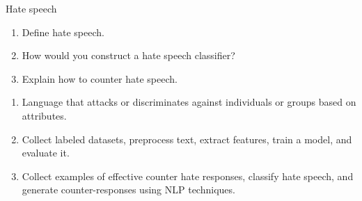 \documentclass{article}
\begin{document}
\begin{exercise}{Hate speech}\label{ex:hate-speech}
  \begin{enumerate}
    \item Define hate speech.
    \item How would you construct a hate speech classifier?
    \item Explain how to counter hate speech.
  \end{enumerate}

  \begin{solution}
    \begin{enumerate}
        \item Language that attacks or discriminates against individuals or groups based on attributes.
        \item Collect labeled datasets, preprocess text, extract features, train a model, and evaluate it.
        \item Collect examples of effective counter hate responses, classify hate speech, and generate counter-responses using NLP techniques.
    \end{enumerate}
  \end{solution}
\end{exercise}
\end{document}
